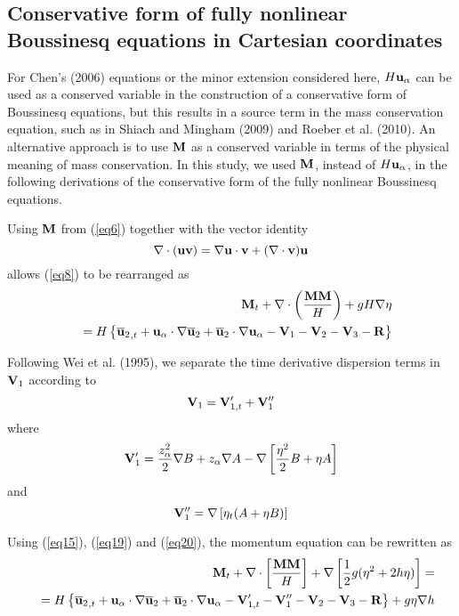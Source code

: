 \documentclass[11pt]{article}
\newcommand{\be}{\begin{equation}}
\newcommand{\ee}{\end{equation}}
\newcommand{\ba}{\begin{eqnarray}}
\newcommand{\ea}{\end{eqnarray}}
\newcommand{\ua}{{\bf u}_\alpha}
\newcommand{\utwo}{\overline{\bf u}_2}
\begin{document}
\subsection{Conservative form of  fully nonlinear Boussinesq equations in Cartesian coordinates}

For Chen's (2006) equations or the minor extension considered here, $H \ua$ can be used as a conserved variable in the  construction of a conservative form of Boussinesq equations, but this results in a source term in the mass conservation equation,  such as in Shiach and Mingham (2009) and Roeber et al. (2010). An alternative  approach is to use ${\bf M}$ as a conserved variable in terms of the physical meaning of mass conservation. In this study, we used ${\bf M}$, instead of $H \ua$, in the following derivations of the conservative form of the fully nonlinear Boussinesq equations.  

Using $\bf{M}$ from (\ref{eq6}) together with the vector identity
\be
\nabla \cdot ({\bf u} {\bf v}) = \nabla {\bf u} \cdot {\bf v} + (\nabla \cdot {\bf v}) {\bf u}  \label{eq16}
\ee
allows (\ref{eq8}) to be rearranged as 
\ba
&   & {\bf M}_t  + \nabla \cdot \left(\frac{{\bf M} {\bf M} }{H}\right)  + gH\nabla\eta  \nonumber \\
&   & = H \left\{ {\utwo}_{,t} + \ua \cdot \nabla \utwo + \utwo \cdot \nabla \ua - {\bf V}_1 - {\bf V}_2 - {\bf V}_3 -{\bf R} \right\}  \label{eq17}
\ea

Following Wei et al. (1995), we separate the time derivative dispersion terms  in  ${\bf V}_1$ according to
\be
{\bf V}_1 = {\bf V}_{1,t}^\prime +{\bf V}_1^{\prime \prime}   \label{eq18}
\ee
where 
\be
{\bf V}_1^\prime  =  \frac{z_\alpha^2}{2} \nabla B + z_{\alpha} \nabla A  - \nabla \left[ \frac{\eta^2}{2} B + \eta A \right]   
\label{eq19}
\ee
and
\be
{\bf V}_1^{\prime \prime} = \nabla \left[ \eta_t  (A + \eta B) \right]  \label{eq20}
\ee

Using (\ref{eq15}),  (\ref{eq19}) and (\ref{eq20}), the momentum equation can be rewritten as
\ba
&   & {\bf M}_t + \nabla \cdot \left [\frac{ {\bf M} {\bf M} }{H}\right] + \nabla \left [ \frac{1}{2} g (\eta^2 +2 h \eta) \right ]  =  \\ \nonumber
&   & = H \left\{ 
{\utwo}_{,t}  + \ua \cdot \nabla \utwo + \utwo \cdot \nabla \ua - {\bf V}^\prime_{1,t} - {\bf V}_1^{\prime\prime}  - {\bf V}_2 - {\bf V}_3 - {\bf R} \right\} + g \eta \nabla h   \label{eq21}
\ea
\end{document}
